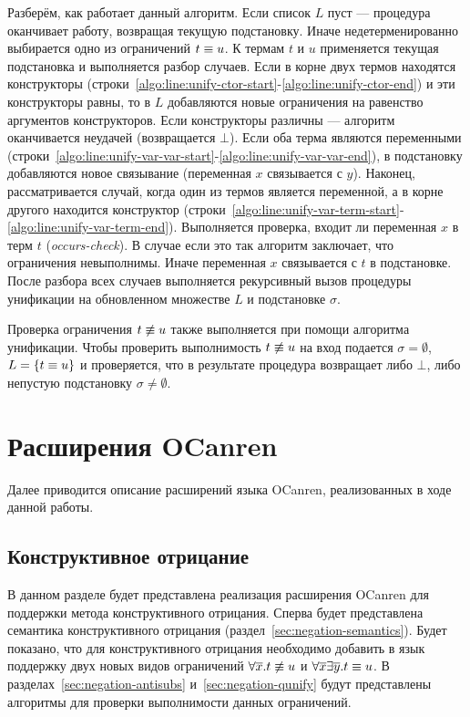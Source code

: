 Разберём, как работает данный алгоритм.
Если список $L$ пуст --- процедура оканчивает работу, возвращая текущую подстановку.
Иначе недетерменированно выбирается одно из ограничений $t \equiv u$.
К термам $t$ и $u$ применяется текущая подстановка и выполняется разбор случаев.
Если в корне двух термов находятся конструкторы 
(строки~\ref{algo:line:unify-ctor-start}-\ref{algo:line:unify-ctor-end})
и эти конструкторы равны, то в $L$ добавляются новые ограничения на 
равенство аргументов конструкторов.
Если конструкторы различны --- алгоритм оканчивается неудачей (возвращается $\bot$).
Если оба терма являются переменными 
(строки~\ref{algo:line:unify-var-var-start}-\ref{algo:line:unify-var-var-end}),
в подстановку добавляются новое связывание
(переменная $x$ связывается с $y$).
Наконец, рассматривается случай, когда один из термов является переменной, 
а в корне другого находится конструктор
(строки~\ref{algo:line:unify-var-term-start}-\ref{algo:line:unify-var-term-end}).
Выполняется проверка, входит 
ли переменная $x$ в терм $t$ (\emph{occurs-check}).
В случае если это так алгоритм заключает, что ограничения невыполнимы.
Иначе переменная $x$ связывается с $t$ в подстановке.
После разбора всех случаев выполняется рекурсивный вызов процедуры унификации
на обновленном множестве $L$ и подстановке $\sigma$.

Проверка ограничения $t \not\equiv u$ также выполняется при помощи алгоритма унификации.
Чтобы проверить выполнимость $t \not\equiv u$
на вход подается $\sigma = \emptyset$, $L = \{t \equiv u\}$
и проверяется, что в результате процедура возвращает 
либо $\bot$, либо непустую подстановку $\sigma \neq \emptyset$.

\section{Расширения OCanren}

Далее приводится описание расширений языка OCanren, реализованных в ходе данной работы. 

\subsection{Конструктивное отрицание}

\label{sec:negation-impl}

В данном разделе будет представлена реализация расширения OCanren 
для поддержки метода конструктивного отрицания.
Сперва будет представлена семантика конструктивного отрицания (раздел~\ref{sec:negation-semantics}). 
Будет показано, что для конструктивного отрицания
необходимо добавить в язык поддержку 
двух новых видов ограничений ${\forall{\overline{x}}. t \not\equiv u}$ 
и $\forall{\overline{x}}\exists{\overline{y}}.t \equiv u$.
В разделах~\ref{sec:negation-antisubs} и~\ref{sec:negation-qunify} 
будут представлены алгоритмы для проверки выполнимости данных ограничений.

